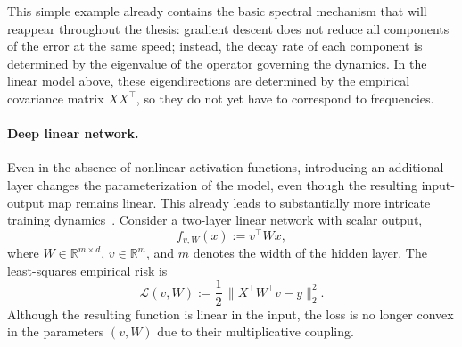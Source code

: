 This simple example already contains the basic spectral mechanism that will
reappear throughout the thesis: gradient descent does not reduce all components
of the error at the same speed; instead, the decay rate of each component is
determined by the eigenvalue of the operator governing the dynamics. In the
linear model above, these eigendirections are determined by the empirical
covariance matrix \(XX^\top\), so they do not yet have to correspond to
frequencies.

\paragraph{Deep linear network.}
Even in the absence of nonlinear activation functions, introducing an
additional layer changes the parameterization of the model, even though the
resulting input-output map remains linear. This already leads to substantially
more intricate training dynamics~\citep{saxe2014exactsolutionsnonlineardynamics}. Consider a two-layer linear network with
scalar output,
\begin{equation}
	f_{v,W}(x) := v^\top W x,
\end{equation}
where $W \in \mathbb{R}^{m \times d}$, $v \in \mathbb{R}^{m}$, and $m$ denotes the
width of the hidden layer. The least-squares empirical risk is
\begin{equation}
	\mathcal{L}(v,W)
	:= \frac{1}{2}\,\bigl\|X^\top W^\top v - y\bigr\|_2^2 .
\end{equation}
Although the resulting function is linear in the input, the loss is no longer
convex in the parameters $(v,W)$ due to their multiplicative coupling.

